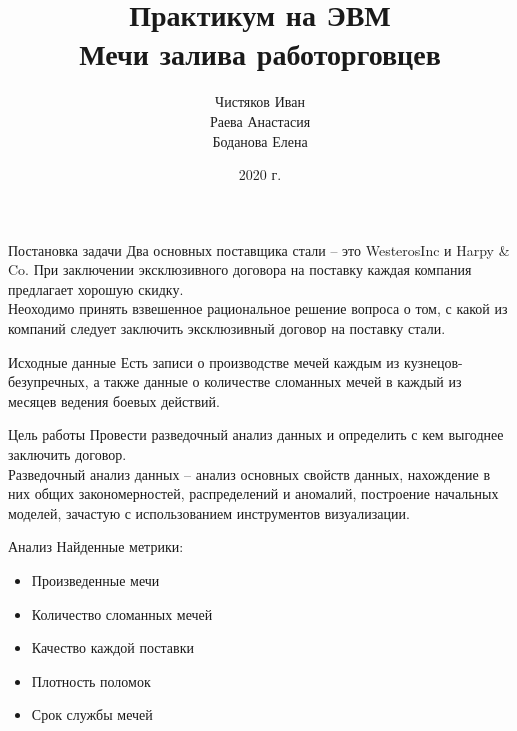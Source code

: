 \documentclass{beamer}
\title{Практикум на ЭВМ\\ Мечи залива работорговцев}
\author{Чистяков Иван \\ Раева Анастасия \\ Боданова Елена}
\institute{МГУ ВМК \\ Исследование Операций}
\date{2020 г.}
\begin{document}
    \begin{frame}
        \maketitle
    \end{frame}
    
    \begin{frame}{Постановка задачи}
        Два основных поставщика стали -- это WesterosInc и Harpy \& Co. 
        При заключении эксклюзивного договора на поставку каждая компания предлагает хорошую скидку.\\
        Неоходимо принять взвешенное рациональное решение вопроса о том, с какой из компаний следует заключить эксклюзивный договор на поставку стали.
        
    \end{frame}
    \begin{frame}{Исходные данные}
        Есть записи о производстве мечей каждым из кузнецов-безупречных, а также данные о количестве сломанных мечей в каждый из месяцев ведения боевых действий.
    \end{frame}
    \begin{frame}{Цель работы}
        Провести разведочный анализ данных и определить с кем выгоднее заключить договор.\\
        Разведочный анализ данных -- анализ основных свойств данных, нахождение в них общих закономерностей, распределений и аномалий, построение начальных моделей, зачастую с использованием инструментов визуализации.
        
    \end{frame}
    
    \begin{frame}{Анализ}
      Найденные метрики:
        \begin{itemize}
            \item Произведенные мечи 
            \item Количество сломанных мечей 
            \item Качество каждой поставки
            \item Плотность поломок
            \item Срок службы мечей
        \end{itemize}
    \end{frame}
    
\end{document}
